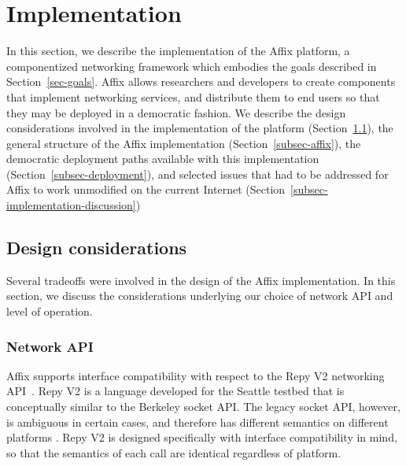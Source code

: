 \section{Implementation}
\label{sec-implementation}


In this section, we describe the implementation 
of the Affix platform, a componentized networking 
framework which embodies the goals 
described in Section~\ref{sec-goals}.
Affix allows researchers and developers to create components
that implement networking services, and distribute them to 
end users so that they may be deployed in a democratic fashion.
We describe the design considerations involved in the 
implementation of the platform (Section~\ref{subsec-design}), the general 
structure of the Affix implementation (Section~\ref{subsec-affix}), 
the democratic deployment paths available 
with this implementation (Section~\ref{subsec-deployment}), 
and selected issues that had to be addressed for Affix to work 
unmodified on the current Internet (Section~\ref{subsec-implementation-discussion})

\subsection{Design considerations}
\label{subsec-design}

Several tradeoffs were involved in the design 
of the Affix implementation. In this section, 
we discuss the considerations 
underlying our choice of network API and
level of operation.
 
\subsubsection{Network API}

Affix supports interface compatibility with respect to 
the Repy V2 networking API~\cite{RepyV2API}.
Repy V2 is a language developed for the Seattle testbed
that is conceptually similar to the 
Berkeley socket API. The legacy socket API, however,
is ambiguous in certain cases, and therefore has 
different semantics on different platforms . 
Repy V2 is designed specifically with interface 
compatibility in mind, so that the semantics 
of each call are identical  
regardless of platform.   


